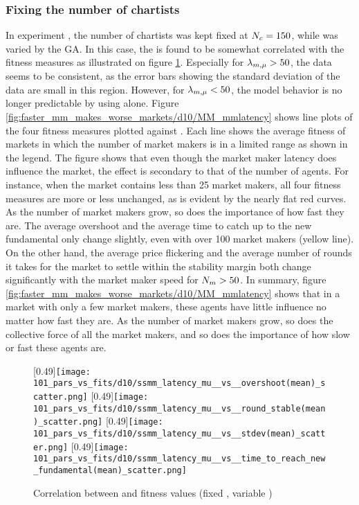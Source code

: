 \subsubsection*{Fixing the number of chartists}
In experiment \dten, the number of chartists was kept fixed at $N_{c} = 150$, while \ssmmnAgents{} was varied by the GA. In this case, the \ssmmlatencymu{} is found to be somewhat correlated with the fitness measures as illustrated on figure \ref{fig:d10_parvfit_ssmmlatencymu}. Especially for $\lambda_{m, \mu} > 50$, the data seems to be consistent, as the error bars showing the standard deviation of the data are small in this region. However, for $\lambda_{m, \mu} < 50$, the model behavior is no longer predictable by using \ssmmlatencymu{} alone. Figure \ref{fig:faster_mm_makes_worse_markets/d10/MM_mmlatency} shows line plots of the four fitness measures plotted against \ssmmlatencymu. Each line shows the average fitness of markets in which the number of market makers is in a limited range as shown in the legend. The figure shows that even though the market maker latency does influence the market, the effect is secondary to that of the number of agents. For instance, when the market contains less than 25 market makers, all four fitness measures are more or less unchanged, as is evident by the nearly flat red curves. As the number of market makers grow, so does the importance of how fast they are. The average overshoot and the average time to catch up to the new fundamental only change slightly, even with over 100 market makers (yellow line). On the other hand, the average price flickering and the average number of rounds it takes for the market to settle within the stability margin both change significantly with the market maker speed for $N_{m} > 50$. In summary, figure \ref{fig:faster_mm_makes_worse_markets/d10/MM_mmlatency} shows that in a market with only a few market makers, these agents have little influence no matter how fast they are. As the number of market makers grow, so does the collective force of all the market makers, and so does the importance of how slow or fast these agents are. 
\begin{figure}
	\centering
	[0.49\linewidth]{\texttt{[image: 101\_pars\_vs\_fits/d10/ssmm\_latency\_mu\_\_vs\_\_overshoot(mean)\_scatter.png]}}
	[0.49\linewidth]{\texttt{[image: 101\_pars\_vs\_fits/d10/ssmm\_latency\_mu\_\_vs\_\_round\_stable(mean)\_scatter.png]}}
	[0.49\linewidth]{\texttt{[image: 101\_pars\_vs\_fits/d10/ssmm\_latency\_mu\_\_vs\_\_stdev(mean)\_scatter.png]}}
	[0.49\linewidth]{\texttt{[image: 101\_pars\_vs\_fits/d10/ssmm\_latency\_mu\_\_vs\_\_time\_to\_reach\_new\_fundamental(mean)\_scatter.png]}}
	\caption{Correlation between \ssmmlatencymu{} and fitness values (fixed \scnAgents, variable \ssmmnAgents)}
	\label{fig:d10_parvfit_ssmmlatencymu}
\end{figure}
